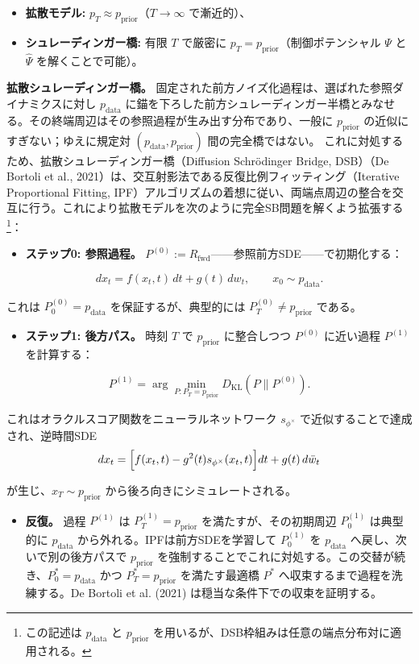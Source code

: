 \begin{itemize}
\item \textbf{拡散モデル:} $p_T\approx p_{\mathrm{prior}}$（$T\to\infty$ で漸近的）、
\item \textbf{シュレーディンガー橋:} 有限 $T$ で厳密に $p_T=p_{\mathrm{prior}}$（制御ポテンシャル $\Psi$ と $\widehat{\Psi}$ を解くことで可能）。
\end{itemize}


\textbf{拡散シュレーディンガー橋。} 固定された前方ノイズ化過程は、選ばれた参照ダイナミクスに対し $p_{\mathrm{data}}$ に錨を下ろした前方シュレーディンガー半橋とみなせる。その終端周辺はその参照過程が生み出す分布であり、一般に $p_{\mathrm{prior}}$ の近似にすぎない；ゆえに規定対 $(p_{\mathrm{data}},p_{\mathrm{prior}})$ 間の完全橋ではない。
これに対処するため、拡散シュレーディンガー橋（Diffusion Schrödinger Bridge, DSB）（De Bortoli et al., 2021）は、交互射影法である反復比例フィッティング（Iterative Proportional Fitting, IPF）アルゴリズムの着想に従い、両端点周辺の整合を交互に行う。これにより拡散モデルを次のように完全SB問題を解くよう拡張する\footnote{この記述は $p_{\mathrm{data}}$ と $p_{\mathrm{prior}}$ を用いるが、DSB枠組みは任意の端点分布対に適用される。}：

\begin{itemize}
\item \textbf{ステップ0: 参照過程。} $P^{(0)}:=R_{\mathrm{fwd}}$——参照前方SDE——で初期化する：
\end{itemize}

\[
dx_t=f(x_t,t)\,dt+g(t)\,dw_t,\qquad x_0\sim p_{\mathrm{data}}.
\]

  これは $P_0^{(0)}=p_{\mathrm{data}}$ を保証するが、典型的には $P_T^{(0)}\neq p_{\mathrm{prior}}$ である。

\begin{itemize}
\item \textbf{ステップ1: 後方パス。} 時刻 $T$ で $p_{\mathrm{prior}}$ に整合しつつ $P^{(0)}$ に近い過程 $P^{(1)}$ を計算する：
\end{itemize}

\[
P^{(1)}=\arg\min_{P:P_T=p_{\mathrm{prior}}} D_{\mathrm{KL}}(P\|P^{(0)}).
\]

  これはオラクルスコア関数をニューラルネットワーク $s_{\phi^\times}$ で近似することで達成され、逆時間SDE
\[
dx_t=\Bigl[f(x_t,t)-g^2(t)s_{\phi^\times}(x_t,t)\Bigr]dt+g(t)\,d\bar{w}_t
\]

  が生じ、$x_T\sim p_{\mathrm{prior}}$ から後ろ向きにシミュレートされる。

\begin{itemize}
\item \textbf{反復。} 過程 $P^{(1)}$ は $P_T^{(1)}=p_{\mathrm{prior}}$ を満たすが、その初期周辺 $P_0^{(1)}$ は典型的に $p_{\mathrm{data}}$ から外れる。IPFは前方SDEを学習して $P_0^{(1)}$ を $p_{\mathrm{data}}$ へ戻し、次いで別の後方パスで $p_{\mathrm{prior}}$ を強制することでこれに対処する。この交替が続き、$P_0^*=p_{\mathrm{data}}$ かつ $P_T^*=p_{\mathrm{prior}}$ を満たす最適橋 $P^*$ へ収束するまで過程を洗練する。De Bortoli et al. (2021) は穏当な条件下での収束を証明する。
\end{itemize}



